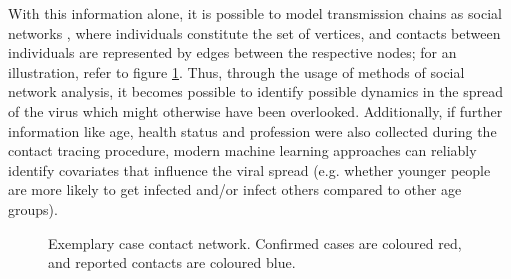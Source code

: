 \documentclass{article}
\begin{document}
	With this information alone, it is possible to model transmission chains as social networks \cite{hainan_publication,shanxi_publication,hancean2022occupations}, where individuals constitute the set of vertices, and contacts between individuals are represented by edges between the respective nodes; for an illustration, refer to figure \ref{fig:example_case_network}. Thus, through the usage of methods of social network analysis, it becomes possible to identify possible dynamics in the spread of the virus which might otherwise have been overlooked. Additionally, if further information like age, health status and profession were also collected during the contact tracing procedure, modern machine learning approaches can reliably identify covariates that influence the viral spread (e.g. whether younger people are more likely to get infected and/or infect others compared to other age groups).
	
	\begin{figure}
		\centering
		\caption{Exemplary case contact network. Confirmed cases are coloured red, and reported contacts are coloured blue.}
		\label{fig:example_case_network}
	\end{figure}
	
\end{document}
